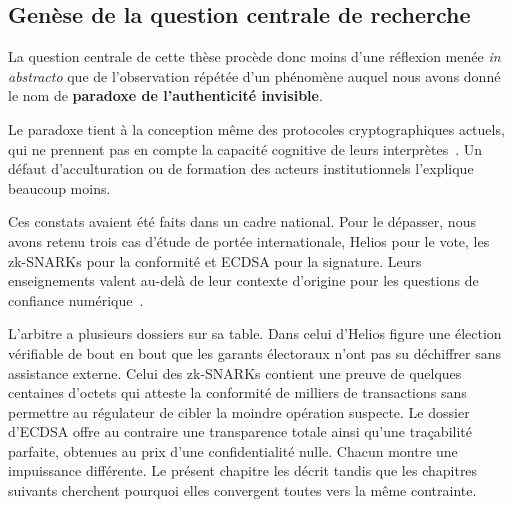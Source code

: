 \subsection{Gen\`ese de la question centrale de recherche}
\label{subsec:genese_question}
\begin{sloppypar}

La question centrale de cette th\`ese proc\`ede donc moins d'une r\'eflexion men\'ee \textit{in abstracto} que de l'observation r\'ep\'et\'ee d'un ph\'enom\`ene auquel nous avons donn\'e le nom de \textbf{paradoxe de l'authenticit\'e invisible}.

Le paradoxe tient \`a la conception m\^eme des protocoles cryptographiques actuels, qui ne prennent pas en compte la capacit\'e cognitive de leurs interpr\`etes~\cite{Simon82,Miller56,Herley09}. Un d\'efaut d'acculturation ou de formation des acteurs institutionnels l'explique beaucoup moins.

Ces constats avaient \'et\'e faits dans un cadre national. Pour le d\'epasser, nous avons retenu trois cas d'\'etude de port\'ee internationale, Helios pour le vote, les zk-SNARKs pour la conformit\'e et ECDSA pour la signature. Leurs enseignements valent au-del\`a de leur contexte d'origine pour les questions de confiance num\'erique~\cite{DeFilippi16,Garay15}.

\end{sloppypar}

\begin{boiteArbitre}
L'arbitre a plusieurs dossiers sur sa table. Dans celui d'Helios figure une
\'election v\'erifiable de bout en bout que les garants \'electoraux n'ont pas su
d\'echiffrer sans assistance externe. Celui des zk-SNARKs contient une preuve de
quelques centaines d'octets qui atteste la conformit\'e de milliers de
transactions sans permettre au r\'egulateur de cibler la moindre op\'eration
suspecte. Le dossier d'ECDSA offre au contraire une transparence totale ainsi
qu'une tra\c{c}abilit\'e parfaite, obtenues au prix d'une confidentialit\'e nulle.
Chacun montre une impuissance diff\'erente. Le pr\'esent chapitre les d\'ecrit
tandis que les chapitres suivants cherchent pourquoi elles convergent toutes
vers la m\^eme contrainte.
\end{boiteArbitre}

